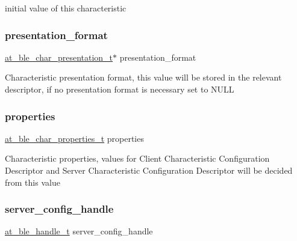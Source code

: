 initial value of this characteristic \mbox{\label{structat__ble__characteristic__t_a6309826fe45ca7d0688ead29f7ae01a2}} 
\subsubsection{\texorpdfstring{presentation\_format}{presentation\_format}}
{\footnotesize\ttfamily \mbox{\hyperlink{structat__ble__char__presentation__t}{at\+\_\+ble\+\_\+char\+\_\+presentation\+\_\+t}}$\ast$ presentation\+\_\+format}

Characteristic presentation format, this value will be stored in the relevant descriptor, if no presentation format is necessary set to N\+U\+LL \mbox{\label{structat__ble__characteristic__t_a0dafa6fd00ebd001cb8b6655e9806ed0}} 
\subsubsection{\texorpdfstring{properties}{properties}}
{\footnotesize\ttfamily \mbox{\hyperlink{at__ble__api_8h_a5f124b442695fa38f139ebe48167698d}{at\+\_\+ble\+\_\+char\+\_\+properties\+\_\+t}} properties}

Characteristic properties, values for Client Characteristic Configuration Descriptor and Server Characteristic Configuration Descriptor will be decided from this value \mbox{\label{structat__ble__characteristic__t_ab15ca7113a171b6391a7e88fff8e81d0}} 
\subsubsection{\texorpdfstring{server\_config\_handle}{server\_config\_handle}}
{\footnotesize\ttfamily \mbox{\hyperlink{at__ble__api_8h_abd23646d0c662860741f787efc8456f2}{at\+\_\+ble\+\_\+handle\+\_\+t}} server\+\_\+config\+\_\+handle}

